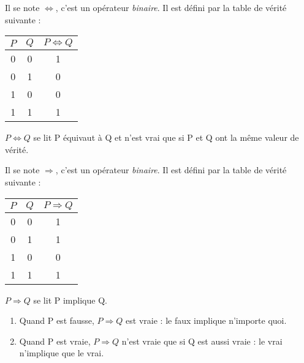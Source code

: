 \documentclass[a4paper,12pt,french]{book}
\begin{document}
\begin{definition}
	Il se note $\Leftrightarrow$, c'est un opérateur \textit{binaire}.
	Il est défini par la table de vérité suivante :
	\begin{center}
		\begin{tabular}{|c|c|c|}
			\hline
			\rowcolor{lightgray}
			$P$ & $Q$ & $P\Leftrightarrow Q$\\
			\hline
			\rowcolor{white}
			0 & 0 & 1\\
			\hline
			\rowcolor{white}
			0 & 1 & 0\\
			\hline
			\rowcolor{white}
			1 & 0 & 0\\
			\hline\rowcolor{white}
			1 & 1 & 1\\
			\hline
		\end{tabular}
	\end{center}
	$P\Leftrightarrow Q$ se lit \og P équivaut à Q\fg{} et n'est vrai que si P et Q ont la même valeur de vérité.
\end{definition}


\begin{definition}[ : implication]
	Il se note $\Rightarrow$, c'est un opérateur \textit{binaire}.
	Il est défini par la table de vérité suivante :
	\begin{center}
		\begin{tabular}{|c|c|c|}
			\hline
			\rowcolor{lightgray}
			$P$ & $Q$ & $P\Rightarrow Q$\\
			\hline
			\rowcolor{white}
			0 & 0 & 1\\
			\hline
			\rowcolor{white}
			0 & 1 & 1\\
			\hline
			\rowcolor{white}
			1 & 0 & 0\\
			\hline\rowcolor{white}
			1 & 1 & 1\\
			\hline
		\end{tabular}
	\end{center}
	$P\Rightarrow Q$ se lit \og P implique Q\fg{}.
	\begin{enumerate}[\textbullet]
		\item 	Quand P est fausse, $P\Rightarrow Q$ est vraie : \og le faux implique n'importe quoi\fg{}.
		\item 	Quand P est vraie, $P\Rightarrow Q$ n'est vraie que si Q est aussi vraie : \og le vrai n'implique que le vrai\fg{}.
	\end{enumerate}
\end{definition}
\end{document}
